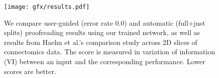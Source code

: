 \begin{figure}[t]
\centering
\texttt{[image: gfx/results.pdf]}
\caption{We compare user-guided (error rate 0.0) and automatic (full+just splits) proofreading results using our trained network,  as well as results from Haehn et al.'s comparison study \cite{haehn_dojo_2014} across 2D slices of connectomics data. The score is measured in variation of information (VI) between an input and the corresponding performance. Lower scores are better.}
\end{figure}
%
%
%
%
%
%
%
%
%
%
